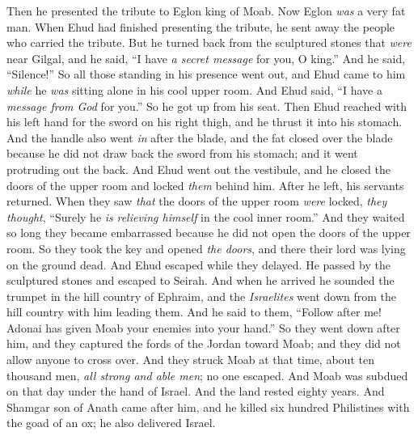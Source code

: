 \begin{biblechapter}
\verse Then he presented the tribute to Eglon king of Moab. Now Eglon \textit{was} a very fat man.
\verse When Ehud had finished presenting the tribute, he sent away the people who carried the tribute.
\verse But he turned back from the sculptured stones that \textit{were} near Gilgal, and he said, “I have \textit{a secret message} for you, O king.” And he said, “Silence!” So all those standing in his presence went out,
\verse and Ehud came to him \textit{while} he \textit{was} sitting alone in his cool upper room. And Ehud said, “I have a \textit{message from God} for you.” So he got up from his seat.
\verse Then Ehud reached with his left hand for the sword on his right thigh, and he thrust it into his stomach.
\verse And the handle also went \textit{in} after the blade, and the fat closed over the blade because he did not draw back the sword from his stomach; and it went protruding out the back.
\verse And Ehud went out the vestibule, and he closed the doors of the upper room and locked \textit{them} behind him.
\verse After he left, his servants returned. When they saw \textit{that} the doors of the upper room \textit{were} locked, \textit{they thought}, “Surely he \textit{is} \textit{relieving himself} in the cool inner room.”
\verse And they waited so long they became embarrassed because he did not open the doors of the upper room. So they took the key and opened \textit{the doors}, and there their lord was lying on the ground dead.
\verse And Ehud escaped while they delayed. He passed by the sculptured stones and escaped to Seirah.
\verse And when he arrived he sounded the trumpet in the hill country of Ephraim, and the \textit{Israelites} went down from the hill country with him leading them.
\verse And he said to them, “Follow after me! Adonai has given Moab your enemies into your hand.” So they went down after him, and they captured the fords of the Jordan toward Moab; and they did not allow anyone to cross over.
\verse And they struck Moab at that time, about ten thousand men, \textit{all strong and able men}; no one escaped.
\verse And Moab was subdued on that day under the hand of Israel. And the land rested eighty years.
 And Shamgar son of Anath came after him, and he killed six hundred Philistines with the goad of an ox; he also delivered Israel.
\end{biblechapter}

